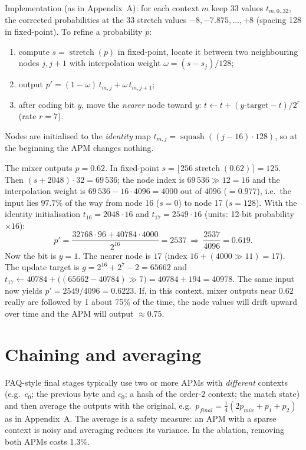 \documentclass[11pt,a4paper,openany]{book}
\newcommand{\st}{\operatorname{stretch}}
\newcommand{\sq}{\operatorname{squash}}
\theoremstyle{definition}
\theoremstyle{remark}
\begin{document}
Implementation (as in Appendix~A): for each context $m$ keep $33$ values $t_{m,0..32}$, the corrected probabilities at the 33 stretch values $-8,-7.875,\ldots,+8$ (spacing 128 in fixed-point). To refine a probability $p$:
\begin{enumerate}
\item compute $s=\st(p)$ in fixed-point, locate it between two neighbouring nodes $j,j+1$ with interpolation weight $\omega=(s-s_j)/128$;
\item output $p'=(1-\omega)\,t_{m,j}+\omega\,t_{m,j+1}$;
\item after coding bit $y$, move the \emph{nearer} node toward $y$: $t\leftarrow t+(y\text{-target}-t)/2^{r}$ (rate $r=7$).
\end{enumerate}
Nodes are initialised to the \emph{identity} map $t_{m,j}=\sq((j-16)\cdot128)$, so at the beginning the APM changes nothing.

\begin{example}
The mixer outputs $p=0.62$. In fixed-point $s=\lfloor256\st(0.62)\rceil=125$. Then $(s+2048)\cdot32=69\,536$; the node index is $69\,536\gg12=16$ and the interpolation weight is $69\,536-16\cdot4096=4000$ out of $4096$ ($=0.977$), i.e.\ the input lies $97.7\%$ of the way from node 16 ($s=0$) to node 17 ($s=128$). With the identity initialisation $t_{16}=2048\cdot16$ and $t_{17}=2549\cdot16$ (units: 12-bit probability $\times16$):
\[
p'=\frac{32768\cdot96+40784\cdot4000}{2^{16}}=2537\ \Rightarrow\ \frac{2537}{4096}=0.619.
\]
Now the bit is $y=1$. The nearer node is $17$ (index $16+(4000\gg11)=17$). The update target is $g=2^{16}+2^{7}-2=65662$ and
$t_{17}\leftarrow40784+\big((65662-40784)\gg7\big)=40784+194=40978$.
The same input now yields $p'=2549/4096=0.6223$. If, in this context, mixer outputs near $0.62$ really are followed by 1 about 75\% of the time, the node values will drift upward over time and the APM will output $\approx0.75$.
\end{example}

\section{Chaining and averaging}

PAQ-style final stages typically use two or more APMs with \emph{different} contexts (e.g.\ $c_0$; the previous byte and $c_0$; a hash of the order-2 context; the match state) and then average the outputs with the original, e.g.\ $p_{final}=\tfrac14(2p_{mix}+p_1+p_2)$ as in Appendix~A. The average is a safety measure: an APM with a sparse context is noisy and averaging reduces its variance. In the ablation, removing both APMs costs $1.3\%$.
\end{document}
